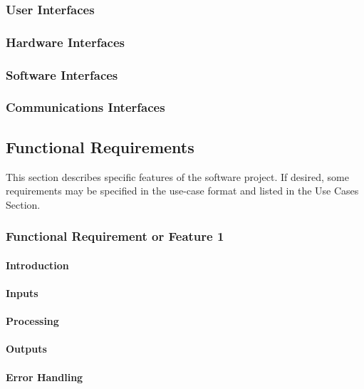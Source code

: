 \documentclass[titlepage]{article}
\begin{document}
\subsubsection{User Interfaces}

\subsubsection{Hardware Interfaces}

\subsubsection{Software Interfaces}

\subsubsection{Communications Interfaces}

\subsection{Functional Requirements}
This section describes specific features of the software project.  If desired, some requirements may be specified in the use-case format and listed in the Use Cases Section.

\subsubsection{Functional Requirement or Feature 1}

\paragraph{Introduction}

\paragraph{Inputs}

\paragraph{Processing}

\paragraph{Outputs}

\paragraph{Error Handling}
\end{document}
